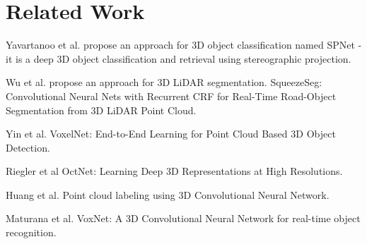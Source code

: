 \section{Related Work}


Yavartanoo et al. \cite{DBLP:journals/corr/abs-1811-01571} propose an approach for 3D object classification  named SPNet - it is a deep 3D object classification and retrieval using stereographic projection. 

Wu et al. \cite{DBLP:conf/icra/WuWYK18} propose an approach for 3D LiDAR segmentation. 
SqueezeSeg: Convolutional Neural Nets with Recurrent {CRF} for Real-Time Road-Object Segmentation from 3D LiDAR Point Cloud. 



Yin et al. \cite{Zhou_2018_CVPR}  VoxelNet: End-to-End Learning for Point Cloud Based 3D Object Detection. 


Riegler et al \cite{DBLP:conf/cvpr/RieglerUG17} OctNet: Learning Deep 3D Representations at High Resolutions.  
 

Huang et al. \cite{DBLP:conf/icpr/HuangY16}  Point cloud labeling using 3D Convolutional Neural Network. 


Maturana et al. \cite{DBLP:conf/iros/MaturanaS15}  VoxNet: {A} 3D Convolutional Neural Network for real-time object recognition.

